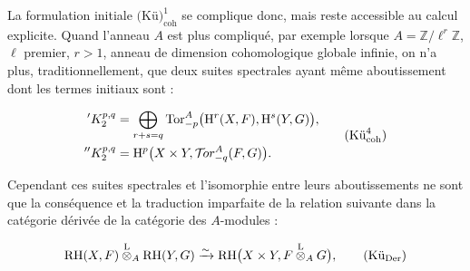 La formulation initiale $\text{(Kü)}_{\mathrm{coh}}^{1}$ se
complique donc, mais reste accessible au calcul explicite. Quand l'anneau $A$
est plus compliqué, par exemple lorsque
$A=\mathbb Z/\ell^r\mathbb Z$, $\ell$ premier, $r>1$, anneau de dimension
cohomologique globale infinie, on n'a plus, traditionnellement, que deux
suites spectrales ayant même aboutissement dont les termes initiaux sont :

\begin{equation}
\begin{aligned}
{}'K_2^{p,q}
  &=\bigoplus_{r+s=q}
    \operatorname{Tor}_{-p}^{A}
    \bigl(\mathrm H^r(X,F),\mathrm H^s(Y,G)\bigr), \\
{}''K_2^{p,q}
  &=\mathrm H^p\bigl(X\times Y,\mathcal T\!or_{-q}^{A}(F,G)\bigr).
\end{aligned}
\tag{$\text{Kü}_{\mathrm{coh}}^{4}$}
\end{equation}

Cependant ces suites spectrales et l'isomorphie entre leurs aboutissements ne
sont que la conséquence et la traduction imparfaite de la relation suivante
dans la catégorie dérivée de la catégorie des $A$-modules :

\begin{equation}
\mathrm{RH}(X,F)\overset{\mathrm L}{\otimes}_A\mathrm{RH}(Y,G)
\xrightarrow{\sim}
\mathrm{RH}\bigl(X\times Y,F\overset{\mathrm L}{\otimes}_A G\bigr),
\tag{$\text{Kü}_{\mathrm{Der}}$}
\end{equation}
